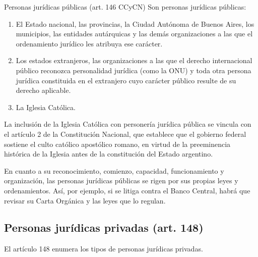 \documentclass[12pt,oneside]{book}
\begin{document}
\begin{definition}{Personas jurídicas públicas (art. 146 CCyCN)}
Son personas jurídicas públicas:
\begin{enumerate}[label=\alph*)]
    \item El Estado nacional, las provincias, la Ciudad Autónoma de Buenos Aires, los municipios, las entidades autárquicas y las demás organizaciones a las que el ordenamiento jurídico les atribuya ese carácter.
    \item Los estados extranjeros, las organizaciones a las que el derecho internacional público reconozca personalidad jurídica (como la ONU) y toda otra persona jurídica constituida en el extranjero cuyo carácter público resulte de su derecho aplicable.
    \item La Iglesia Católica.
\end{enumerate}
\end{definition}

La inclusión de la Iglesia Católica con personería jurídica pública se vincula con el artículo 2 de la Constitución Nacional, que establece que el gobierno federal sostiene el culto católico apostólico romano, en virtud de la preeminencia histórica de la Iglesia antes de la constitución del Estado argentino.

En cuanto a su reconocimiento, comienzo, capacidad, funcionamiento y organización, las personas jurídicas públicas se rigen por sus propias leyes y ordenamientos. Así, por ejemplo, si se litiga contra el Banco Central, habrá que revisar su Carta Orgánica y las leyes que lo regulan.

\subsection{Personas jurídicas privadas (art. 148)}

El artículo 148 enumera los tipos de personas jurídicas privadas.
\end{document}
